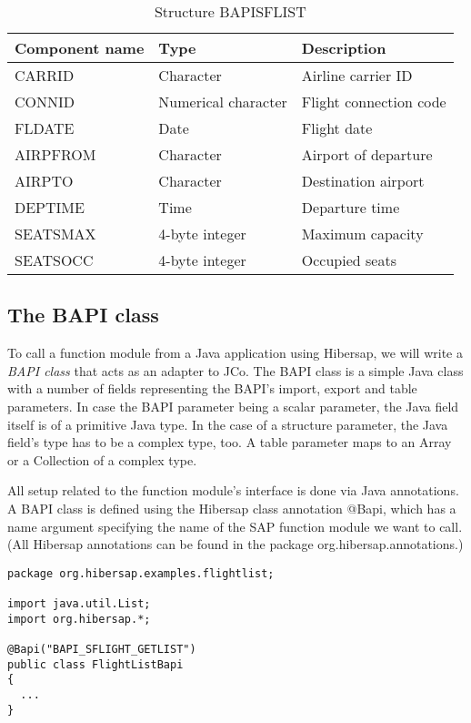 \begin{table}[H]
  \centering
  \begin{tabular}{lll} \toprule
    \textbf{Component name} & \textbf{Type}        & \textbf{Description} \\ \midrule
    CARRID                  & Character            & Airline carrier ID \\ 
    CONNID                  & Numerical character  & Flight connection code \\ 
    FLDATE                  & Date                 & Flight date \\ 
    AIRPFROM                & Character            & Airport of departure \\ 
    AIRPTO                  & Character            & Destination airport \\ 
    DEPTIME                 & Time                 & Departure time \\ 
    SEATSMAX                & 4-byte integer       & Maximum capacity \\ 
    SEATSOCC                & 4-byte integer       & Occupied seats \\ \bottomrule
  \end{tabular}
  \caption{Structure BAPISFLIST}
  \label{tab:Bapisflist}
\end{table}


\subsection{The BAPI class}

To call a function module from a Java application using Hibersap, we will write a \textit{BAPI class} that acts as
an adapter to JCo. The BAPI class is a simple Java class with a number of fields representing the BAPI's import,
export and table parameters. In case the BAPI parameter being a scalar parameter, the Java field itself is of a
primitive Java type. In the case of a structure parameter, the Java field's type has to be a complex type, too.
A table parameter maps to an Array or a Collection of a complex type.

All setup related to the function module's interface is done via Java annotations.
A BAPI class is defined using the Hibersap class annotation @Bapi,
which has a name argument specifying the name of the SAP function module we want to call.
(All Hibersap annotations can be found in the package org.hibersap.annotations.)

\begin{lstlisting}[caption=The BAPI class]
package org.hibersap.examples.flightlist;

import java.util.List;
import org.hibersap.*;

@Bapi("BAPI_SFLIGHT_GETLIST")
public class FlightListBapi
{
  ...
}
\end{lstlisting}

